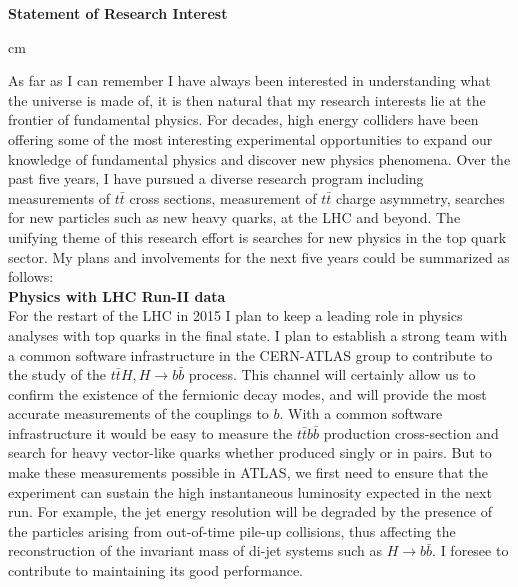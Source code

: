 \documentclass[12pt]{article}
\begin{document}
\pagestyle{fancy}
\fancyhf{}


\begin{center}
{\bf \Large Statement of Research Interest} \\
\end{center}


 cm

\noindent
As far as I can remember I have always been interested in understanding what the universe is made of, 
it is then natural that my research interests lie at the frontier of fundamental physics. 
For decades, high energy colliders have been offering some of the most interesting experimental 
opportunities to expand our knowledge of fundamental physics and discover new physics phenomena. 
Over the past five years, I have pursued a diverse research program including measurements of $t\bar{t}$ cross sections, measurement of $t\bar{t}$ charge asymmetry, 
searches for new particles such as new heavy quarks, at the LHC and beyond. The unifying theme of this research effort is searches for new physics in the top quark sector. 
My plans and involvements for the next five years could be summarized as follows:\\

\noindent
{\bf Physics with LHC Run-II data}\\
For the restart of the LHC in 2015 I plan to keep a leading role in physics analyses with top quarks in the final state. 
I plan to establish a strong team with a common software infrastructure in the CERN-ATLAS group to contribute to the study of the $t\bar{t}H, H \rightarrow b\bar{b}$ process.
This channel will certainly allow us to confirm the existence of the fermionic decay modes, and will provide the most accurate measurements of the couplings to $b$.
With a common software infrastructure it would be easy to measure the $t\bar{t}b\bar{b}$ production cross-section and search for heavy vector-like quarks whether produced singly or in pairs.
But to make these measurements possible in ATLAS, we first need to ensure that the experiment can sustain the high instantaneous luminosity expected in the next run.
For example, the jet energy resolution will be degraded by the presence of the particles arising from out-of-time pile-up collisions, thus affecting the reconstruction of the 
invariant mass of di-jet systems such as $H \rightarrow b\bar{b}$. I foresee to contribute to maintaining its good performance.\\
\end{document}
